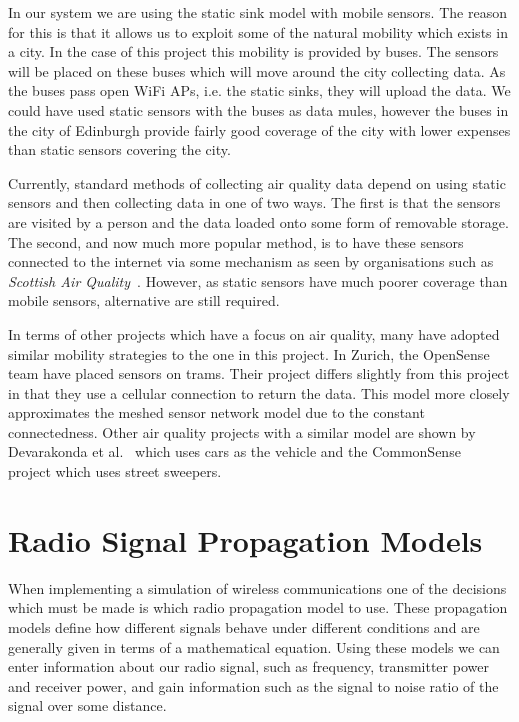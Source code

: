     In our system we are using the static sink model with mobile sensors. The reason for this is that it allows us to exploit some of the natural mobility which exists in a city. In the case of this project this mobility is provided by buses. The sensors will be placed on these buses which will move around the city collecting data. As the buses pass open WiFi APs, i.e. the static sinks, they will upload the data. We could have used static sensors with the buses as data mules, however the buses in the city of Edinburgh provide fairly good coverage of the city with lower expenses than static sensors covering the city. 

    Currently, standard methods of collecting air quality data depend on using static sensors and then collecting data in one of two ways. The first is that the sensors are visited by a person and the data loaded onto some form of removable storage. The second, and now much more popular method, is to have these sensors connected to the internet via some mechanism as seen by organisations such as \emph{Scottish Air Quality}~\cite{scottishairquality}. However, as static sensors have much poorer coverage than mobile sensors, alternative are still required. 

    In terms of other projects which have a focus on air quality, many have adopted similar mobility strategies to the one in this project. In Zurich, the OpenSense\cite{opensensezurich} team have placed sensors on trams. Their project differs slightly from this project in that they use a cellular connection to return the data. This model more closely approximates the meshed sensor network model due to the constant connectedness. Other air quality projects with a similar model are shown by Devarakonda et al.~\cite{rtairquality} which uses cars as the vehicle and the CommonSense~\cite{commonsense} project which uses street sweepers. 





\section{Radio Signal Propagation Models}


    When implementing a simulation of wireless communications one of the decisions which must be made is which radio propagation model to use. These propagation models define how different signals behave under different conditions and are generally given in terms of a mathematical equation. Using these models we can enter information about our radio signal, such as frequency, transmitter power and receiver power,  and gain information such as the signal to noise ratio of the signal over some distance.


